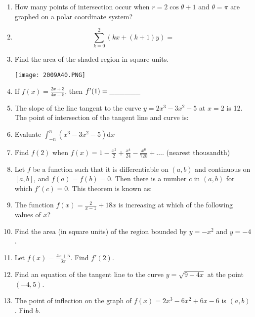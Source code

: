 \documentclass[../uilmath.tex]{subfiles}
\begin{document}
\begin{enumerate}[label=\bfseries\arabic*.]
    \item %
    How many points of intersection occur when $r=2\cos\theta+1$ and $\theta=\pi$ are graphed on a polar coordinate system?

    \item %
    \[\sum^2_{k=0}(kx+(k+1)y)=\]

    \item %
    Find the area of the shaded region in square units.
    \begin{center}
        \texttt{[image: 2009A40.PNG]}
    \end{center}

    \item %
    If $f(x)=\frac{2x+3}{4x-5}$, then $f'(1)=\_\_\_\_\_\_$

    \item %
    The slope of the line tangent to the curve $y=2x^3-3x^2-5$ at $x=2$ is 12. The point of intersection of the tangent line and curve is:

    \item %
    Evaluate $\int^n_{-n}(x^3-3x^2-5)\mathrm{d}x$

    \item %
    Find $f(2)$ when $f(x)=1-\frac{x^2}{2}+\frac{x^4}{24}-\frac{x^6}{720}+\dots$. (nearest thousandth)

    \item %
    Let $f$ be a function such that it is differentiable on $(a,b)$ and continuous on $[a,b]$, and $f(a)=f(b)=0$. Then there is a number 
    $c$ in $(a,b)$ for which $f'(c)=0$. This theorem is known as: 

    \item %
    The function $f(x)=\frac{2}{x-1}+18x$ is increasing at which of the following values of $x$?

    \item %
    Find the area (in square units) of the region bounded by $y=-x^2$ and $y=-4$.

    \item %
    Let $f(x)=\frac{4x+5}{3x}$. Find $f'(2)$.

    \item %
    Find an equation of the tangent line to the curve $y=\sqrt{9-4x}$ at the point $(-4,5)$.

    \item %
    The point of inflection on the graph of $f(x)=2x^3-6x^2+6x-6$ is $(a,b)$. Find $b$.


\end{enumerate}
\end{document}

